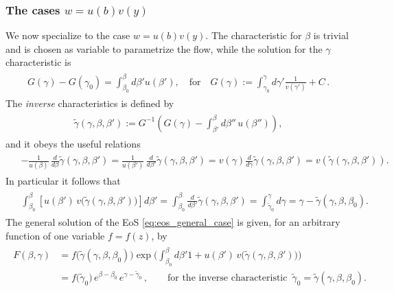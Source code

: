 \subsubsection{The cases $w=u(b)v(y)$}
%
We now specialize to the case $w=u(b)v(y)$.
The characteristic for $\beta$ is trivial and is chosen as variable to parametrize the flow, while the solution for the $\gamma$ characteristic is
{\small
\begin{align}\begin{aligned}
    G(\gamma)-G(\gamma_0)=\int_{\beta_0}^\beta d\beta' u(\beta'), \quad \text{for}\quad G(\gamma):=\int^\gamma_{\gamma_0} \!\!d\gamma' \frac{1}{v(\gamma')} + C\,.
\end{aligned}\end{align}}
The \emph{inverse} characteristics is defined by 
{\small\begin{align}\label{eq:inverse_characteristic_y_separable}
\begin{aligned}
    \tilde{\gamma}(\gamma,\beta,\beta'):=G^{-1}\left(G(\gamma)-\int^\beta_{\beta'}d\beta''\, u(\beta'')\right),
\end{aligned}\end{align}}
and it obeys the useful relations
{\small\begin{align}\label{eq:formulas_characteristic_y}
    \begin{aligned}
    &-\frac{1}{u(\beta)}\,\frac{d}{d\beta}\tilde{\gamma}(\gamma,\beta,\beta')= \frac{1}{u(\beta')}\,\frac{d}{d\beta'}\tilde{\gamma}(\gamma,\beta,\beta')= v(\gamma) \frac{d}{d\gamma}\tilde{\gamma}(\gamma,\beta,\beta')=v(\tilde{\gamma}(\gamma,\beta,\beta')).
\end{aligned}\end{align}}
In particular it follows that 
{\small
\begin{align}\begin{aligned}
    & \int_{\beta_0}^\beta \left[u(\beta')\,v\big(\tilde{\gamma}(\gamma,\beta,\beta')\big)\right]d\beta'= \int_{\beta_0}^\beta \frac{d}{d\beta'}\tilde{\gamma}(\gamma,\beta,\beta')= \int_{\tilde{\gamma}_0}^\gamma d\gamma = \gamma-\tilde{\gamma}(\gamma,\beta,\beta_0).
\end{aligned}\end{align}}
The general solution of the EoS \eqref{eq:eos_general_case} is given, for an arbitrary function of one variable $f=f(z)$, by
{\small
\begin{align}\begin{aligned}
    F(\beta,\gamma)&=f\big(\tilde{\gamma}(\gamma,\beta,\beta_0)\big) \exp\Big(\int_{\beta_0}^\beta d\beta' 1 + u(\beta')\,v\big(\tilde{\gamma}(\gamma,\beta,\beta')\big)\Big)\\[3pt]
    &=f\big(\tilde{\gamma}_0\big)\, e^{\beta-\beta_0}\, e^{\gamma-\tilde{\gamma}_0}\,, \qquad \text{for the inverse characteristic}\,\,\, \tilde{\gamma}_0=\tilde{\gamma}(\gamma,\beta,\beta_0).
\end{aligned}\end{align}}
